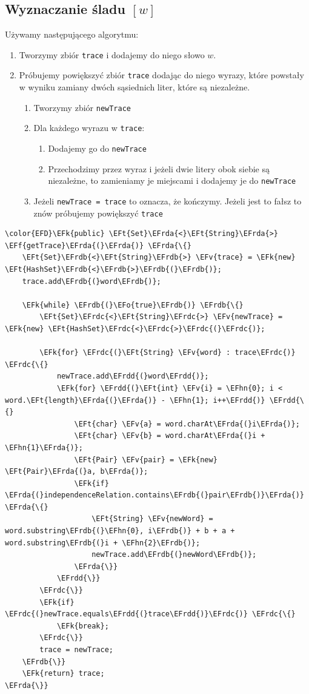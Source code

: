 \documentclass[11pt]{article}
\newcommand{\EFk}[1]{\textcolor{EFk}{#1}} %
\newcommand{\EFf}[1]{\textcolor{EFf}{#1}} %
\newcommand{\EFv}[1]{\textcolor{EFv}{#1}} %
\newcommand{\EFt}[1]{\textcolor{EFt}{#1}} %
\newcommand{\EFo}[1]{\textcolor{EFo}{#1}} %
\newcommand{\EFhn}[1]{\textcolor{EFhn}{#1}} %
\newcommand{\EFrda}[1]{#1} %
\newcommand{\EFrdb}[1]{\textcolor{EFrdb}{#1}} %
\newcommand{\EFrdc}[1]{\textcolor{EFrdc}{#1}} %
\newcommand{\EFrdd}[1]{\textcolor{EFrdd}{#1}} %
\begin{document}
\subsection*{Wyznaczanie śladu \([w]\)}
\label{sec:orgcc4ff92}
Używamy następującego algorytmu:
\begin{enumerate}
\item Tworzymy zbiór \texttt{trace} i dodajemy do niego słowo \(w\).
\item Próbujemy powiększyć zbiór \texttt{trace} dodając do niego wyrazy, które powstały w wyniku
zamiany dwóch sąsiednich liter, które są niezależne.
\begin{enumerate}
\item Tworzymy zbiór \texttt{newTrace}
\item Dla każdego wyrazu w \texttt{trace}:
\begin{enumerate}
\item Dodajemy go do \texttt{newTrace}
\item Przechodzimy przez wyraz i jeżeli dwie litery obok siebie są niezależne,
to zamieniamy je miejscami i dodajemy je do \texttt{newTrace}
\end{enumerate}
\item Jeżeli \texttt{newTrace = trace} to oznacza, że kończymy. Jeżeli jest to fałsz to znów
próbujemy powiększyć \texttt{trace}
\end{enumerate}
\end{enumerate}
\newpage

\begin{Code}
\begin{Verbatim}
\color{EFD}\EFk{public} \EFt{Set}\EFrda{<}\EFt{String}\EFrda{>} \EFf{getTrace}\EFrda{(}\EFrda{)} \EFrda{\{}
    \EFt{Set}\EFrdb{<}\EFt{String}\EFrdb{>} \EFv{trace} = \EFk{new} \EFt{HashSet}\EFrdb{<}\EFrdb{>}\EFrdb{(}\EFrdb{)};
    trace.add\EFrdb{(}word\EFrdb{)};

    \EFk{while} \EFrdb{(}\EFo{true}\EFrdb{)} \EFrdb{\{}
        \EFt{Set}\EFrdc{<}\EFt{String}\EFrdc{>} \EFv{newTrace} = \EFk{new} \EFt{HashSet}\EFrdc{<}\EFrdc{>}\EFrdc{(}\EFrdc{)};

        \EFk{for} \EFrdc{(}\EFt{String} \EFv{word} : trace\EFrdc{)} \EFrdc{\{}
            newTrace.add\EFrdd{(}word\EFrdd{)};
            \EFk{for} \EFrdd{(}\EFt{int} \EFv{i} = \EFhn{0}; i < word.\EFt{length}\EFrda{(}\EFrda{)} - \EFhn{1}; i++\EFrdd{)} \EFrdd{\{}
                \EFt{char} \EFv{a} = word.charAt\EFrda{(}i\EFrda{)};
                \EFt{char} \EFv{b} = word.charAt\EFrda{(}i + \EFhn{1}\EFrda{)};
                \EFt{Pair} \EFv{pair} = \EFk{new} \EFt{Pair}\EFrda{(}a, b\EFrda{)};
                \EFk{if} \EFrda{(}independenceRelation.contains\EFrdb{(}pair\EFrdb{)}\EFrda{)} \EFrda{\{}
                    \EFt{String} \EFv{newWord} = word.substring\EFrdb{(}\EFhn{0}, i\EFrdb{)} + b + a + word.substring\EFrdb{(}i + \EFhn{2}\EFrdb{)};
                    newTrace.add\EFrdb{(}newWord\EFrdb{)};
                \EFrda{\}}
            \EFrdd{\}}
        \EFrdc{\}}
        \EFk{if} \EFrdc{(}newTrace.equals\EFrdd{(}trace\EFrdd{)}\EFrdc{)} \EFrdc{\{}
            \EFk{break};
        \EFrdc{\}}
        trace = newTrace;
    \EFrdb{\}}
    \EFk{return} trace;
\EFrda{\}}
\end{Verbatim}
\end{Code}
\end{document}
